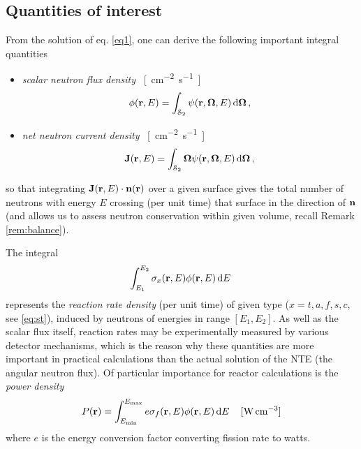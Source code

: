 \subsection{Quantities of interest}\label{sec:qoi}
From the solution of eq. \eqref{eq1}, one can derive the following important integral quantities
\begin{itemize}
  \item \textit{scalar neutron flux density} \SI{}{[cm^{-2}.s^{-1}]}
  \begin{equation}\label{eq:scalar_flux}
    \phi(\mathbf{r}, E) = \int_{\mathcal{S}_2}\psi(\mathbf{r},\mathbf{\Omega},E)\,\text{d}\mathbf{\Omega}\,,
  \end{equation}
  \item \textit{net neutron current density} \SI{}{[cm^{-2}.s^{-1}]}
	\begin{equation}\label{eq:bJ}
		\mathbf{J}(\mathbf{r}, E)	= \int_{\mathcal{S}_2}\mathbf{\Omega}\psi(\mathbf{r},\mathbf{\Omega},E)\,\text{d}\mathbf{\Omega}\,,
	\end{equation}
\end{itemize}
so that integrating $\mathbf{J}(\mathbf{r},E)\cdot\mathbf{n}(\mathbf{r})$ over a given surface 
gives the total number of neutrons with energy $E$ crossing (per unit time) that surface in the direction of 
$\mathbf{n}$ (and allows us to assess neutron conservation within given volume, recall Remark \ref{rem:balance}).

The integral
\begin{equation}\label{eq:rr}
  \int_{E_1}^{E_2}\sigma_x(\mathbf{r}, E) \phi(\mathbf{r}, E)\,\text{d}E\,
\end{equation}
represents the \textit{reaction rate density} (per unit time) of given type ($x = t,a,f,s,c$, see \eqref{eq:st}), 
induced by neutrons of energies in range $[E_1, E_2]$. 
As well as the scalar flux itself, reaction rates may be experimentally measured
by various detector mechanisms, which is the reason why these quantities are more important in practical calculations
than the actual solution of the NTE (the angular neutron flux). Of particular importance for reactor calculations is the
\textit{power density} 
\begin{equation}\label{eq:power}
	P(\mathbf{r}) = \int_{E_{\text{min}}}^{E_{\text{max}}}e\sigma_f(\mathbf{r}, E) \phi(\mathbf{r}, E)\,\text{d}E\, \quad \SI{}{[W.cm^{-3}]}
\end{equation}
where $e$ is the energy conversion factor converting fission rate to watts.

